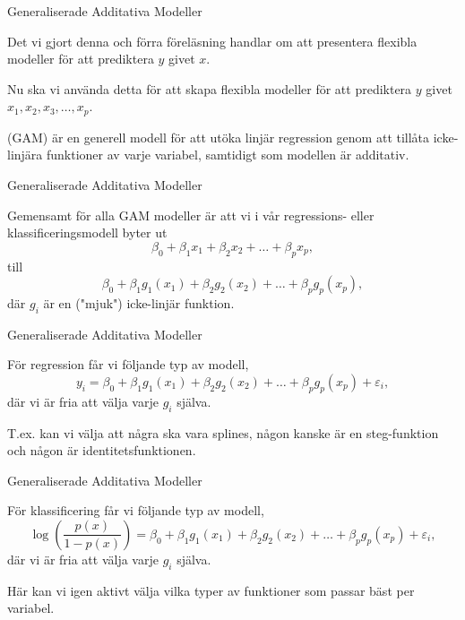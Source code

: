 \documentclass[10pt,english]{beamer}
\begin{document}
\begin{frame}{Generaliserade Additativa Modeller}

    Det vi gjort denna och förra föreläsning handlar om att presentera flexibla modeller för att prediktera $y$ givet $x$.
    
    Nu ska vi använda detta för att skapa flexibla modeller för att prediktera $y$ givet $x_1, x_2, x_3, \ldots, x_p$.

    \begin{greenbox}
         (GAM) är en generell modell för att utöka linjär regression genom att tillåta icke-linjära funktioner av varje variabel, samtidigt som modellen är additativ.
    \end{greenbox}
    
\end{frame}

\begin{frame}{Generaliserade Additativa Modeller}
    
    Gemensamt för alla GAM modeller är att vi i vår regressions- eller klassificeringsmodell byter ut
    \begin{equation*}
        \beta_0 + \beta_1 x_1 + \beta_2 x_2 + \ldots + \beta_p x_p,
    \end{equation*}
    till
    \begin{equation*}
        \beta_0 + \beta_1 g_1(x_1) + \beta_2 g_2(x_2) + \ldots + \beta_p g_p(x_p),
    \end{equation*}
    där $g_i$ är en ("mjuk") icke-linjär funktion.

\end{frame}

\begin{frame}{Generaliserade Additativa Modeller}
    
    För regression får vi följande typ av modell,
    \begin{equation*}
        y_i = \beta_0 + \beta_1 g_1(x_1) + \beta_2 g_2(x_2) + \ldots + \beta_p g_p(x_p) + \varepsilon_i,
    \end{equation*}
    där vi är fria att välja varje $g_i$ själva.

    T.ex. kan vi välja att några ska vara splines, någon kanske är en steg-funktion och någon är identitetsfunktionen.

\end{frame}

\begin{frame}{Generaliserade Additativa Modeller}
    
    För klassificering får vi följande typ av modell,
    \begin{equation*}
        \log\left(\frac{p(x)}{1 - p(x)}\right) = \beta_0 + \beta_1 g_1(x_1) + \beta_2 g_2(x_2) + \ldots + \beta_p g_p(x_p) + \varepsilon_i,
    \end{equation*}
    där vi är fria att välja varje $g_i$ själva.

    Här kan vi igen aktivt välja vilka typer av funktioner som passar bäst per variabel.

\end{frame}
\end{document}

